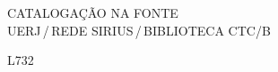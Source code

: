 %
% 


\begin{titlepage}
	\begin{center}
\vfill
\singlespacing
	\vspace*{30mm}
	{CATALOGAÇÃO NA FONTE\\ \vspace{1.5mm}
	UERJ\,/\,REDE SIRIUS\,/\,BIBLIOTECA CTC/B}\\
	\vspace{1.5mm}
	\begin{boxedminipage}{140mm}
	\begin{minipage}{5mm}
		\vspace{-84mm}
		L732
	\end{minipage}
	\hfill
	\raisebox{8.5mm}{
	\begin{minipage}[top]{115mm}
		\vspace*{5mm}


\end{minipage}}
\end{boxedminipage}
\end{center}
\end{titlepage}
